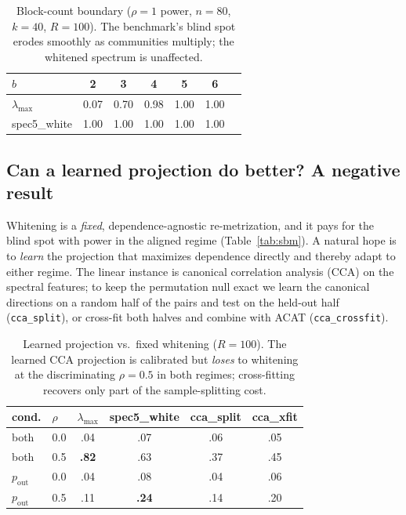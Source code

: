 \documentclass[11pt]{article}
\begin{document}
\begin{table}[ht]
\centering
\small
\caption{Block-count boundary ($\rho = 1$ power, $n = 80$, $k = 40$,
$R = 100$). The benchmark's blind spot erodes smoothly as communities multiply;
the whitened spectrum is unaffected.}
\label{tab:boundary}
\begin{tabular}{lcccccc}
\toprule
$b$ & 2 & 3 & 4 & 5 & 6 \\
\midrule
$\lambda_{\max}$  & 0.07 & 0.70 & 0.98 & 1.00 & 1.00 \\
spec5\_white      & 1.00 & 1.00 & 1.00 & 1.00 & 1.00 \\
\bottomrule
\end{tabular}
\end{table}

\subsection{Can a learned projection do better? A negative result}
\label{sec:learned}

Whitening is a \emph{fixed}, dependence-agnostic re-metrization, and it pays for
the blind spot with power in the aligned regime (Table~\ref{tab:sbm}). A natural
hope is to \emph{learn} the projection that maximizes dependence directly and
thereby adapt to either regime. The linear instance is canonical correlation
analysis (CCA) on the spectral features; to keep the permutation null exact we
learn the canonical directions on a random half of the pairs and test on the
held-out half (\texttt{cca\_split}), or cross-fit both halves and combine with
ACAT (\texttt{cca\_crossfit}).

\begin{table}[ht]
\centering
\small
\caption{Learned projection vs.\ fixed whitening ($R = 100$). The learned CCA
projection is calibrated but \emph{loses} to whitening at the discriminating
$\rho = 0.5$ in both regimes; cross-fitting recovers only part of the
sample-splitting cost.}
\label{tab:learned}
\begin{tabular}{llcccc}
\toprule
cond. & $\rho$ & $\lambda_{\max}$ & spec5\_white & cca\_split & cca\_xfit \\
\midrule
both & 0.0 & .04 & .07 & .06 & .05 \\
both & 0.5 & \textbf{.82} & .63 & .37 & .45 \\
$p_{\mathrm{out}}$ & 0.0 & .04 & .08 & .04 & .06 \\
$p_{\mathrm{out}}$ & 0.5 & .11 & \textbf{.24} & .14 & .20 \\
\bottomrule
\end{tabular}
\end{table}
\end{document}
